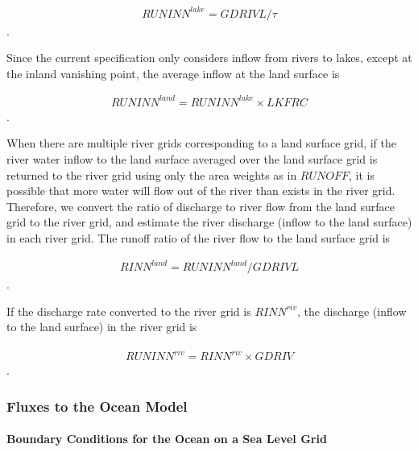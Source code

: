 \begin{eqnarray} RUNINN^{lake}=GDRIVL/\tau \end{eqnarray}.

Since the current specification only considers inflow from rivers to
lakes, except at the inland vanishing point, the average inflow at the
land surface is

\begin{eqnarray} RUNINN^{land}=RUNINN^{lake} \times LKFRC \end{eqnarray}.

When there are multiple river grids corresponding to a land surface
grid, if the river water inflow to the land surface averaged over the
land surface grid is returned to the river grid using only the area
weights as in \(RUNOFF\), it is possible that more water will flow out
of the river than exists in the river grid. Therefore, we convert the
ratio of discharge to river flow from the land surface grid to the river
grid, and estimate the river discharge (inflow to the land surface) in
each river grid. The runoff ratio of the river flow to the land surface
grid is

\begin{eqnarray} RINN^{land}=RUNINN^{land}/GDRIVL \end{eqnarray}.

If the discharge rate converted to the river grid is \(RINN^{riv}\), the
discharge (inflow to the land surface) in the river grid is

\begin{eqnarray} RUNINN^{riv}=RINN^{riv} \times GDRIV \end{eqnarray}.

\hypertarget{fluxes-to-the-ocean-model}{%
\subsubsection{Fluxes to the Ocean
Model}\label{fluxes-to-the-ocean-model}}

\hypertarget{boundary-conditions-for-the-ocean-on-a-sea-level-grid}{%
\paragraph{Boundary Conditions for the Ocean on a Sea Level
Grid}\label{boundary-conditions-for-the-ocean-on-a-sea-level-grid}}

